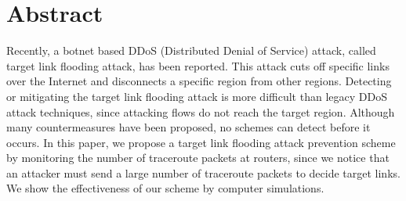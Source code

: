 \RequirePackage 
\section*{Abstract}

Recently, a botnet based DDoS (Distributed Denial of Service) attack, called target link flooding attack, has been reported.
This attack cuts off specific links over the Internet and disconnects a specific region from other regions.
Detecting or mitigating the target link flooding attack is more difficult than legacy DDoS attack techniques, since attacking flows do not reach the target region. 
Although many countermeasures have been proposed, no schemes can detect before it occurs.
In this paper, we propose a target link flooding attack prevention scheme by monitoring the number of traceroute packets at routers, since we notice that an attacker must send a large number of traceroute packets to decide target links. 
We show the effectiveness of our scheme by computer simulations.
